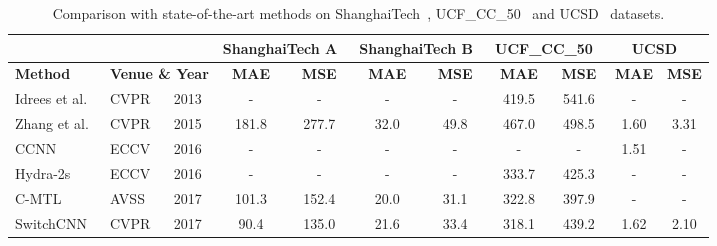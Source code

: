\documentclass[sigconf]{acmart}
\begin{document}
\begin{table}[t]
\caption{\small Comparison with state-of-the-art methods on ShanghaiTech~\cite{MCNN-16}, UCF\_CC\_50~\cite{r-mrf-count-multi-source-13} and UCSD~\cite{deep-crowd-scene-15} datasets.}
\small
\renewcommand\arraystretch{0.95}
\begin{center}
\vspace{-2mm}
\begin{tabular}{|lll|cc|cc|cc|cc|}
\hline
&     &      & \multicolumn{2}{c|}{\textbf{ShanghaiTech A}~\cite{MCNN-16}} & \multicolumn{2}{c|}{\textbf{ShanghaiTech B}~\cite{MCNN-16}} & \multicolumn{2}{c|}{\textbf{UCF\_CC\_50}~\cite{r-mrf-count-multi-source-13}} & \multicolumn{2}{c|}{\textbf{UCSD}~\cite{deep-crowd-scene-15} }     \\ \hline
\multicolumn{1}{|l|}{\textbf{Method}} & \multicolumn{2}{l|}{\textbf{Venue \& Year}}     & \textbf{MAE}              & \textbf{MSE}             & \textbf{MAE}             & \textbf{MSE}              & \textbf{MAE}             & \textbf{MSE}            & \textbf{MAE}           & \textbf{MSE}           \\ \hline \hline
\multicolumn{1}{|l|}{Idrees et al.~\cite{r-mrf-count-multi-source-13}}   & CVPR                  & 2013 & -                & -               & -               & -                & 419.5           & 541.6          & -             & -             \\
\multicolumn{1}{|l|}{Zhang et al.~\cite{deep-crowd-scene-15}}    & CVPR                  & 2015 & 181.8            & 277.7           & 32.0            & 49.8             & 467.0           & 498.5          & 1.60          & 3.31          \\
\multicolumn{1}{|l|}{CCNN~\cite{deep-multi-perspetive-free-16}}            & ECCV                  & 2016 & -                & -               & -               & -                & -               & -              & 1.51          & -             \\
\multicolumn{1}{|l|}{Hydra-2s~\cite{deep-multi-perspetive-free-16}}        & ECCV                  & 2016 & -                & -               & -               & -                & 333.7           & 425.3          & -             & -             \\
\multicolumn{1}{|l|}{C-MTL~\cite{deep-fscale-multi-task-17}}           & AVSS                  & 2017 & 101.3            & 152.4           & 20.0            & 31.1             & 322.8           & 397.9          & -             & -             \\
\multicolumn{1}{|l|}{SwitchCNN~\cite{deep-switch-17}}       & CVPR                  & 2017 & 90.4             & 135.0           & 21.6            & 33.4             & 318.1           & 439.2          & 1.62          & 2.10          \\

\end{tabular}
\end{center}
\end{table}
\end{document}
